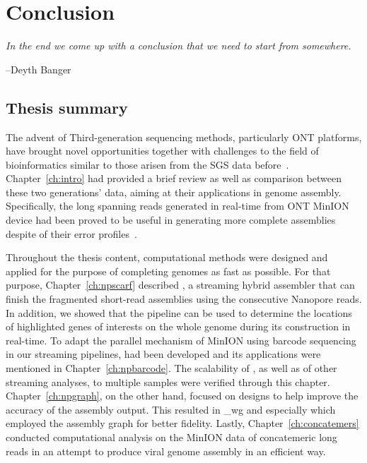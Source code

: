 \chapter{Conclusion}\label{ch:conclusion}
\thispagestyle{empty}
\vspace*{\fill}
\epigraph{\emph{In the end we come up with a conclusion that we need to start from somewhere.}}
{--Deyth Banger}

\clearpage

\section{Thesis summary}
The advent of Third-generation sequencing methods, particularly ONT platforms, have brought novel opportunities together with challenges to the field of bioinformatics similar to those arisen from the SGS data before~\cite{SchadtTK2010,ThkurRB2012}.
Chapter~\ref{ch:intro} had provided a brief review as well as comparison between these two generations' data, aiming at their applications in genome assembly.
Specifically, the long spanning reads generated in real-time from ONT MinION device had been proved to be useful in generating more complete assemblies despite of their error profiles~\cite{GoodwinGE2015,MadouiEC2015,Karlsson2015}. 

Throughout the thesis content, computational methods were designed and applied for the purpose of completing genomes as fast as possible.   
For that purpose, Chapter~\ref{ch:npscarf} described \npscarf{}, a streaming hybrid assembler that can finish the fragmented short-read assemblies using the consecutive Nanopore reads. In addition, we showed that the pipeline can be used to determine the locations of highlighted genes of interests on the whole genome during its construction in real-time.
To adapt the parallel mechanism of MinION using barcode sequencing in our streaming pipelines, \npbarcode{} had been developed and its applications were mentioned in Chapter~\ref{ch:npbarcode}. The scalability of \npscarf{}, as well as of other streaming analyses, to multiple samples were verified through this chapter.
Chapter~\ref{ch:npgraph}, on the other hand, focused on designs to help improve the accuracy of the assembly output. This resulted in \npscarf{}\_wg and especially \npgraph{} which employed the assembly graph for better fidelity.
Lastly, Chapter~\ref{ch:concatemers} conducted computational analysis on the MinION data of concatemeric long reads in an attempt to produce viral genome assembly in an efficient way.

